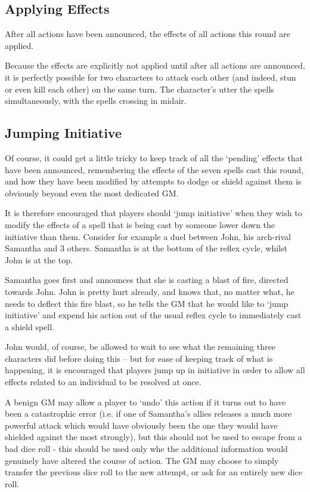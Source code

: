 \subsection{Applying Effects}

After all actions have been announced, the effects of all actions this round are applied. 

Because the effects are explicitly not applied until after all actions are announced, it is perfectly possible for two characters to attack each other (and indeed, stun or even kill each other) on the same turn. The character's utter the spells simultaneously, with the spells crossing in midair.

\subsection{Jumping Initiative} 

Of course, it could get a little tricky to keep track of all the `pending' effects that have been announced, remembering the effects of the seven spells cast this round, and how they have been modified by attempts to dodge or shield against them is obviously beyond even the most dedicated GM. 

It is therefore encouraged that players should `jump initiative' when they wish to modify the effects of a spell that is being cast by someone lower down the initiative than them. Consider for example a duel between John, his arch-rival Samantha and 3 others. Samantha is at the bottom of the reflex cycle, whilst John is at the top. 

Samantha goes first and announces that she is casting a \levelThree{} blast of fire, directed towards John. John is pretty hurt already, and knows that, no matter what, he needs to deflect this fire blast, so he tells the GM that he would like to `jump initiative' and expend his action out of the usual reflex cycle to immediately cast a \levelTwo{} shield spell. 

John would, of course, be allowed to wait to see what the remaining three characters did before doing this -- but for ease of keeping track of what is happening, it is encouraged that players jump up in initiative in order to allow all effects related to an individual to be resolved at once. 

A benign GM may allow a player to `undo' this action if it turns out to have been a catastrophic error (i.e. if one of Samantha's allies releases a much more powerful attack which would have obviously been the one they would have shielded against the most strongly), but this should not be used to escape from a bad dice roll - this should be used only whe the additional information would genuinely have altered the course of action. The GM may choose to simply transfer the previous dice roll to the new attempt, or ask for an entirely new dice roll. 


